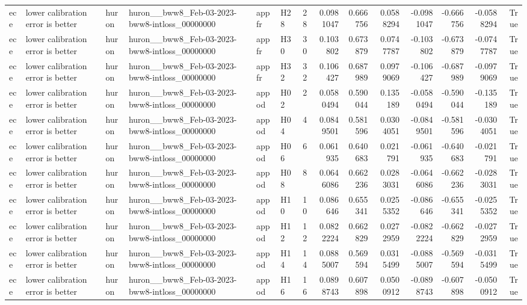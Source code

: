 \begin{longtable}{llllllrrrrrrrr}
ece & lower calibration error is better & huron & huron\_\_bww8\_Feb-03-2023-bww8-intloss\_00000000 & appfr & H28 & 28 & 0.0981047 & 0.666756 & 0.0588294 & -0.0981047 & -0.666756 & -0.0588294 & True \\
ece & lower calibration error is better & huron & huron\_\_bww8\_Feb-03-2023-bww8-intloss\_00000000 & appfr & H30 & 30 & 0.103802 & 0.673879 & 0.0747787 & -0.103802 & -0.673879 & -0.0747787 & True \\
ece & lower calibration error is better & huron & huron\_\_bww8\_Feb-03-2023-bww8-intloss\_00000000 & appfr & H32 & 32 & 0.106427 & 0.687989 & 0.0979069 & -0.106427 & -0.687989 & -0.0979069 & True \\
ece & lower calibration error is better & huron & huron\_\_bww8\_Feb-03-2023-bww8-intloss\_00000000 & appod & H02 & 2 & 0.0580494 & 0.590044 & 0.135189 & -0.0580494 & -0.590044 & -0.135189 & True \\
ece & lower calibration error is better & huron & huron\_\_bww8\_Feb-03-2023-bww8-intloss\_00000000 & appod & H04 & 4 & 0.0849501 & 0.581596 & 0.0304051 & -0.0849501 & -0.581596 & -0.0304051 & True \\
ece & lower calibration error is better & huron & huron\_\_bww8\_Feb-03-2023-bww8-intloss\_00000000 & appod & H06 & 6 & 0.061935 & 0.640683 & 0.021791 & -0.061935 & -0.640683 & -0.021791 & True \\
ece & lower calibration error is better & huron & huron\_\_bww8\_Feb-03-2023-bww8-intloss\_00000000 & appod & H08 & 8 & 0.0646086 & 0.662236 & 0.0283031 & -0.0646086 & -0.662236 & -0.0283031 & True \\
ece & lower calibration error is better & huron & huron\_\_bww8\_Feb-03-2023-bww8-intloss\_00000000 & appod & H10 & 10 & 0.086646 & 0.655341 & 0.0255352 & -0.086646 & -0.655341 & -0.0255352 & True \\
ece & lower calibration error is better & huron & huron\_\_bww8\_Feb-03-2023-bww8-intloss\_00000000 & appod & H12 & 12 & 0.0822224 & 0.662829 & 0.0272959 & -0.0822224 & -0.662829 & -0.0272959 & True \\
ece & lower calibration error is better & huron & huron\_\_bww8\_Feb-03-2023-bww8-intloss\_00000000 & appod & H14 & 14 & 0.0885007 & 0.569594 & 0.0315499 & -0.0885007 & -0.569594 & -0.0315499 & True \\
ece & lower calibration error is better & huron & huron\_\_bww8\_Feb-03-2023-bww8-intloss\_00000000 & appod & H16 & 16 & 0.0898743 & 0.607898 & 0.0500912 & -0.0898743 & -0.607898 & -0.0500912 & True \\

\end{longtable}
